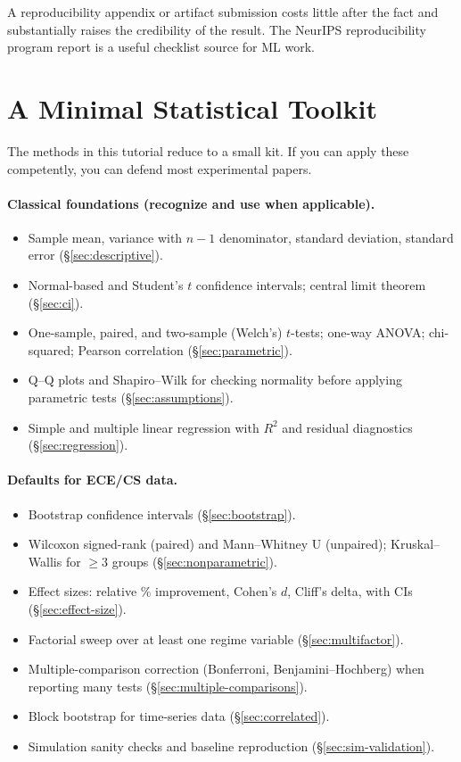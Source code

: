 \documentclass[11pt]{article}
\begin{document}
A reproducibility appendix or artifact submission costs little after the fact and substantially raises the credibility of the result. The NeurIPS reproducibility program report \citep{pineau2021reproducibility} is a useful checklist source for ML work.

\section{A Minimal Statistical Toolkit}
\label{sec:toolkit}

The methods in this tutorial reduce to a small kit. If you can apply these competently, you can defend most experimental papers.

\paragraph{Classical foundations (recognize and use when applicable).}
\begin{itemize}
    \item Sample mean, variance with $n-1$ denominator, standard deviation, standard error (\S\ref{sec:descriptive}).
    \item Normal-based and Student's $t$ confidence intervals; central limit theorem (\S\ref{sec:ci}).
    \item One-sample, paired, and two-sample (Welch's) $t$-tests; one-way ANOVA; chi-squared; Pearson correlation (\S\ref{sec:parametric}).
    \item Q--Q plots and Shapiro--Wilk for checking normality before applying parametric tests (\S\ref{sec:assumptions}).
    \item Simple and multiple linear regression with $R^2$ and residual diagnostics (\S\ref{sec:regression}).
\end{itemize}

\paragraph{Defaults for ECE/CS data.}
\begin{itemize}
    \item Bootstrap confidence intervals (\S\ref{sec:bootstrap}).
    \item Wilcoxon signed-rank (paired) and Mann--Whitney U (unpaired); Kruskal--Wallis for $\geq 3$ groups (\S\ref{sec:nonparametric}).
    \item Effect sizes: relative \% improvement, Cohen's $d$, Cliff's delta, with CIs (\S\ref{sec:effect-size}).
    \item Factorial sweep over at least one regime variable (\S\ref{sec:multifactor}).
    \item Multiple-comparison correction (Bonferroni, Benjamini--Hochberg) when reporting many tests (\S\ref{sec:multiple-comparisons}).
    \item Block bootstrap for time-series data (\S\ref{sec:correlated}).
    \item Simulation sanity checks and baseline reproduction (\S\ref{sec:sim-validation}).
\end{itemize}
\end{document}
